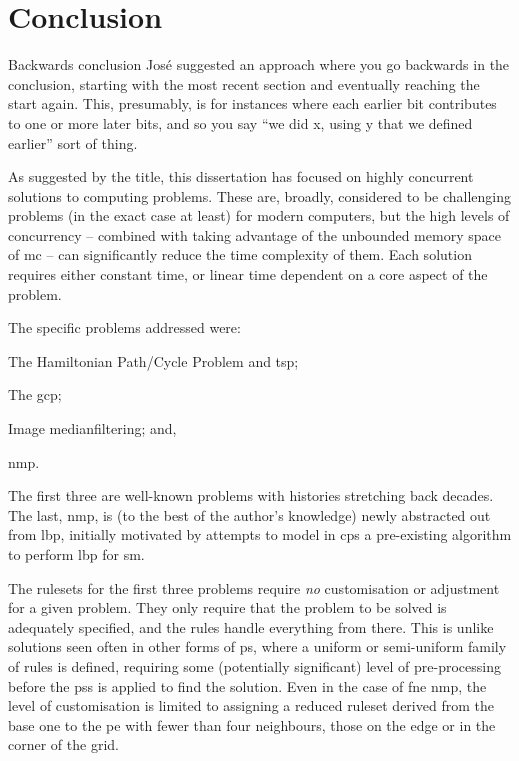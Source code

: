 \chapter{\label{chap:conc}Conclusion}

\begin{anfxerror}{Backwards conclusion}
José suggested an approach where you go backwards in the conclusion, starting with the most recent section and eventually reaching the start again.  This, presumably, is for instances where each earlier bit contributes to one or more later bits, and so you say \enquote{we did x, using y that we defined earlier} sort of thing.
\end{anfxerror}

As suggested by the title, this dissertation has focused on highly concurrent solutions to computing problems.  These are, broadly, considered to be challenging problems (in the exact case at least) for modern computers, but the high levels of concurrency -- combined with taking advantage of the unbounded memory space of \gls{mc} -- can significantly reduce the time complexity of them.  Each solution requires either constant time, or linear time dependent on a core aspect of the problem.

The specific problems addressed were:
\begin{inparaenum}[(1)]
\item The Hamiltonian Path/Cycle Problem and \gls{tsp};
\item The \gls{gcp};
\item Image \gls{medianfilter}ing; and,
\item \gls{nmp}.
\end{inparaenum}
The first three are well-known problems with histories stretching back decades.  The last, \gls{nmp}, is (to the best of the author's knowledge) newly abstracted out from \gls{lbp}, initially motivated by attempts to model in \gls{cps} a pre-existing algorithm to perform \gls{lbp} for \gls{sm}.

The \glspl{ruleset} for the first three problems require \emph{no} customisation or adjustment for a given problem.  They only require that the problem to be solved is adequately specified, and the rules handle everything from there.  This is unlike solutions seen often in other forms of \gls{ps}, where a uniform or semi-uniform family of rules is defined, requiring some (potentially significant) level of pre-processing before the \glspl{ps} is applied to find the solution.  Even in the case of \gls{fne} \gls{nmp}, the level of customisation is limited to assigning a reduced \gls{ruleset} derived from the base one to the \gls{pe} with fewer than four neighbours, \ie{} those on the edge or in the corner of the grid.


